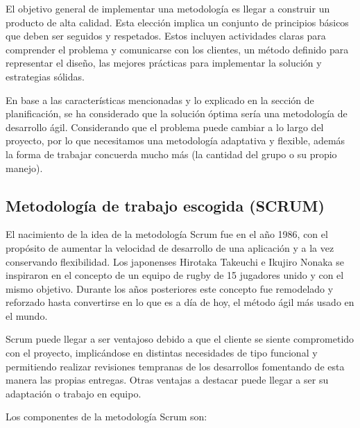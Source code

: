 \vspace{0.3cm}

El objetivo general de implementar una metodología es llegar a construir un producto de alta calidad. Esta elección implica un conjunto de principios básicos que deben ser seguidos y respetados. Estos incluyen actividades claras para comprender el problema y comunicarse con los clientes, un método definido para representar el diseño, las mejores prácticas para implementar la solución y estrategias sólidas. \cite{maida2015metodologias}

\vspace{0.3cm}

En base a las características mencionadas y lo explicado en la sección de planificación, se ha considerado que la solución óptima sería una metodología de desarrollo ágil. Considerando que el problema puede cambiar a lo largo del proyecto, por lo que necesitamos una metodología adaptativa y flexible, además la forma de trabajar concuerda mucho más (la cantidad del grupo o su propio manejo).

\subsection{Metodología de trabajo escogida (SCRUM)}
El nacimiento de la idea de la metodología Scrum fue en el año 1986, con el propósito de aumentar la velocidad de desarrollo de una aplicación y a la vez conservando flexibilidad. Los japonenses Hirotaka Takeuchi e Ikujiro Nonaka  se inspiraron en el concepto de un equipo de rugby de 15 jugadores unido y con el mismo objetivo. Durante los años posteriores este concepto fue remodelado y reforzado hasta convertirse en lo que es a día de hoy, el método ágil más usado en el mundo. \cite{rodriguez2015que}

\vspace{0.3cm}

Scrum puede llegar a ser ventajoso debido a que el cliente se siente comprometido con el proyecto, implicándose en distintas necesidades de tipo funcional y permitiendo realizar revisiones tempranas de los desarrollos fomentando de esta manera las propias entregas. Otras ventajas a destacar puede llegar a ser su adaptación o trabajo en equipo. \cite{rodriguez2015que}

\vspace{0.3cm}

Los componentes de la metodología Scrum son: \cite{rad2019fundamentos}


